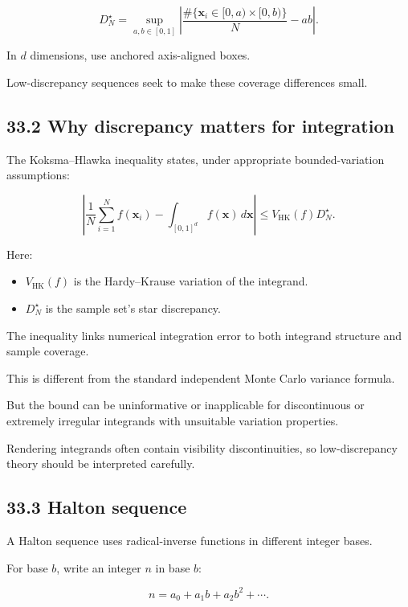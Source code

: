 \[ \boxed{ D_N^\star= \sup_{a,b\in[0,1]} \left| \frac{\#\{\mathbf x_i\in[0,a)\times[0,b)\}}N-ab \right| }. \]

In \(d\) dimensions, use anchored axis-aligned boxes.

Low-discrepancy sequences seek to make these coverage differences small.

\subsection{33.2 Why discrepancy matters for integration}\label{02-foundations-ii-ch031-why-discrepancy-matters-for-integration}

The Koksma--Hlawka inequality states, under appropriate bounded-variation assumptions:

\[ \boxed{ \left| \frac1N\sum_{i=1}^{N}f(\mathbf x_i) - \int_{[0,1]^d}f(\mathbf x)\,d\mathbf x \right| \le V_{\mathrm{HK}}(f)D_N^\star }. \]

Here:

\begin{itemize}
\tightlist
\item
  \(V_{\mathrm{HK}}(f)\) is the Hardy--Krause variation of the integrand.
\item
  \(D_N^\star\) is the sample set's star discrepancy.
\end{itemize}

The inequality links numerical integration error to both integrand structure and sample coverage.

This is different from the standard independent Monte Carlo variance formula.

But the bound can be uninformative or inapplicable for discontinuous or extremely irregular integrands with unsuitable variation properties.

Rendering integrands often contain visibility discontinuities, so low-discrepancy theory should be interpreted carefully.

\subsection{33.3 Halton sequence}\label{02-foundations-ii-ch031-halton-sequence}

A Halton sequence uses radical-inverse functions in different integer bases.

For base \(b\), write an integer \(n\) in base \(b\):

\[ n=a_0+a_1b+a_2b^2+\cdots. \]

